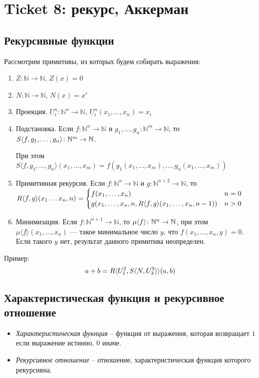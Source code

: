 \section{Ticket 8: рекурс, Аккерман}
\label{sec-10}
\subsection{Рекурсивные функции}
\label{sec-10-1}
Рассмотрим примитивы, из которых будем собирать выражения:

\begin{enumerate}
\item $Z \colon \mathbb{N} \rightarrow \mathbb{N}$, $Z(x) = 0$
\item $N \colon \mathbb{N} \rightarrow \mathbb{N}$, $N(x) = x'$
\item Проекция. $U^n_i \colon \mathbb{N}^n \rightarrow \mathbb{N}$, $U^n_i (x_1, \dotsc, x_n) = x_i$
\item Подстановка. Если $f \colon \mathbb{N}^n \rightarrow \mathbb{N}$ и $g_1, \dotsc, g_n \colon \mathbb{N}^m \rightarrow \mathbb{N}$, 
    то $S\langle f,g_1,\dotsc, g_n\rangle \colon \mathbb{N}^m \rightarrow \mathbb{N}$.

    При этом $S\langle{}f,g_1,\dotsc, g_n\rangle (x_1,\dotsc, x_m) = f(g_1(x_1,\dotsc, x_m), \dotsc, g_n(x_1,\dotsc, x_m))$
\item Примитивная рекурсия. Если $f \colon \mathbb{N}^n     \to \mathbb{N}$ и 
                                 $g \colon \mathbb{N}^{n+2} \to \mathbb{N}$, то
	$R\langle f, g\rangle(x_1\ldots{}x_n, n) = \begin{cases}
    	f(x_1, \dotsc, x_n) & n = 0 \\
    	g(x_1, \dotsc, x_n, n, R\langle f, g\rangle(x_1, \dotsc, x_n, n - 1)) & n > 0
	\end{cases}$
\item Минимизация. Если $f \colon \mathbb{N}^{n+1} \rightarrow \mathbb{N}$,
    то $\mu \langle f\rangle\colon \mathbb{N}^n \rightarrow \mathbb{N}$, при этом
  $\mu \langle{}f\rangle (x_1,\dotsc,x_n)$ --- такое минимальное число $y$, что $f(x_1,\dotsc, x_n, y) = 0$.
  Если такого $y$ нет, результат данного примитива неопределен.
\end{enumerate}

Пример:
\[a + b = R\langle U^2_1, S\langle N, U^3_3\rangle\rangle(a, b)\]
\subsection{Характеристическая функция и рекурсивное отношение}
\label{sec-10-2}
\begin{itemize}
\item \emph{Характеристическая фукнция} -- функция от выражения, которая возвращает $1$ если выражение истинно, $0$ иначе.
\item \emph{Рекурсивное отношение} -- отношение, характеристическая функция
которого рекурсивна.
\end{itemize}
